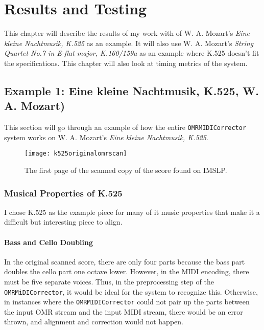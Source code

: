 \chapter{Results and Testing}
This chapter will describe the results of my work with of W. A. Mozart's \textit{Eine kleine Nachtmusik, K.525} as an example. It will also use W. A. Mozart's \textit{String Quartet No.7 in E-flat major, K.160/159a} as an example where K.525 doesn't fit the specifications. This chapter will also look at timing metrics of the system.

\section{Example 1: Eine kleine Nachtmusik, K.525, W. A. Mozart)}
This section will go through an example of how the entire \texttt{OMRMIDICorrector} system works on W. A. Mozart's \textit{Eine kleine Nachtmusik, K.525}.

\begin{figure}[H]
\centering
\texttt{[image: k525originalomrscan]}
\caption{The first page of the scanned copy of the score found on IMSLP.}
\end{figure}

\subsection{Musical Properties of K.525}
I chose K.525 as the example piece for many of it music properties that make it a difficult but interesting piece to align. 

\subsubsection{Bass and Cello Doubling}
In the original scanned score, there are only four parts because the bass part doubles the cello part one octave lower. However, in the MIDI encoding, there must be five separate voices. Thus, in the preprocessing step of the \texttt{OMRMiDICorrector}, it would be ideal for the system to recognize this. Otherwise, in instances where the \texttt{OMRMIDICorrector} could not pair up the parts between the input OMR stream and the input MIDI stream, there would be an error thrown, and alignment and correction would not happen. 

